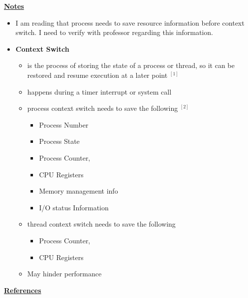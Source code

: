 \documentclass[12pt]{article}
\begin{document}
\begin{enumerate}[1.]
\begin{enumerate}[a)]
        \underline{\textbf{Notes}}

        \begin{itemize}
            \item I am reading that process needs to save resource information
            before context switch. I need to verify with professor regarding this information.
            \item \textbf{Context Switch}

            \begin{itemize}
                \item is the process of storing the state of a process or thread,
                so it can be restored and resume execution at a later point $^{[1]}$
                \item happens during a timer interrupt or system call
                \item process context switch needs to save the following $^{[2]}$

                \begin{itemize}
                    \item Process Number
                    \item Process State
                    \item Process Counter,
                    \item CPU Registers
                    \item Memory management info
                    \item I/O status Information
                \end{itemize}

                \item thread context switch needs to save the following

                \begin{itemize}
                    \item Process Counter,
                    \item CPU Registers
                \end{itemize}

                \item May hinder performance
            \end{itemize}
        \end{itemize}

        \bigskip

        \underline{\textbf{References}}


\end{enumerate}
\end{enumerate}
\end{document}
